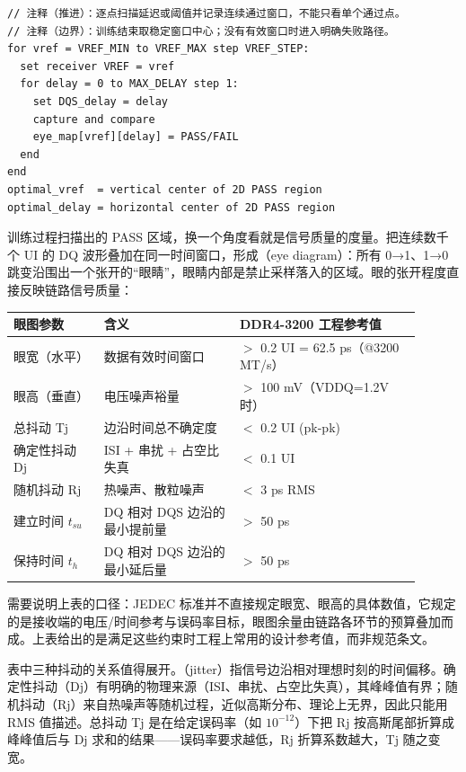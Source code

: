 \begin{lstlisting}
// 注释（推进）：逐点扫描延迟或阈值并记录连续通过窗口，不能只看单个通过点。
// 注释（边界）：训练结束取稳定窗口中心；没有有效窗口时进入明确失败路径。
for vref = VREF_MIN to VREF_MAX step VREF_STEP:
  set receiver VREF = vref
  for delay = 0 to MAX_DELAY step 1:
    set DQS_delay = delay
    capture and compare
    eye_map[vref][delay] = PASS/FAIL
  end
end
optimal_vref  = vertical center of 2D PASS region
optimal_delay = horizontal center of 2D PASS region
\end{lstlisting}



训练过程扫描出的 PASS 区域，换一个角度看就是信号质量的度量。把连续数千个 UI 的 DQ 波形叠加在同一时间窗口，形成（eye diagram）：所有 0→1、1→0 跳变沿围出一个张开的“眼睛”，眼睛内部是禁止采样落入的区域。眼的张开程度直接反映链路信号质量：

\begin{longtable}{L{0.2\linewidth}L{0.3\linewidth}L{0.4\linewidth}}
\toprule
眼图参数 & 含义 & DDR4-3200 工程参考值 \\
\midrule
眼宽（水平） & 数据有效时间窗口 & $>$ 0.2 UI = 62.5 ps（@3200 MT/s） \\\tablerowrule
眼高（垂直） & 电压噪声裕量 & $>$ 100 mV（VDDQ=1.2V 时） \\\tablerowrule
总抖动 Tj & 边沿时间总不确定度 & $<$ 0.2 UI (pk-pk) \\\tablerowrule
确定性抖动 Dj & ISI + 串扰 + 占空比失真 & $<$ 0.1 UI \\\tablerowrule
随机抖动 Rj & 热噪声、散粒噪声 & $<$ 3 ps RMS \\\tablerowrule
建立时间 $t_{su}$ & DQ 相对 DQS 边沿的最小提前量 & $>$ 50 ps \\\tablerowrule
保持时间 $t_{h}$ & DQ 相对 DQS 边沿的最小延后量 & $>$ 50 ps \\
\bottomrule
\end{longtable}

需要说明上表的口径：JEDEC 标准并不直接规定眼宽、眼高的具体数值，它规定的是接收端的电压/时间参考与误码率目标，眼图余量由链路各环节的预算叠加而成。上表给出的是满足这些约束时工程上常用的设计参考值，而非规范条文。

表中三种抖动的关系值得展开。（jitter）指信号边沿相对理想时刻的时间偏移。确定性抖动（Dj）有明确的物理来源（ISI、串扰、占空比失真），其峰峰值有界；随机抖动（Rj）来自热噪声等随机过程，近似高斯分布、理论上无界，因此只能用 RMS 值描述。总抖动 Tj 是在给定误码率（如 $10^{-12}$）下把 Rj 按高斯尾部折算成峰峰值后与 Dj 求和的结果——误码率要求越低，Rj 折算系数越大，Tj 随之变宽。

